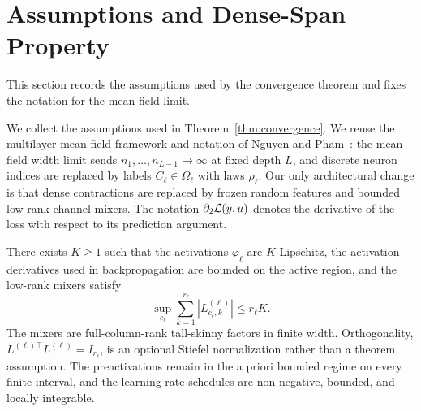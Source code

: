 \section{Assumptions and Dense-Span Property}
\label{app:assumptions}

This section records the assumptions used by the convergence theorem and fixes the notation for the mean-field limit.

We collect the assumptions used in Theorem~\ref{thm:convergence}. We reuse the multilayer mean-field framework and notation of Nguyen and Pham~\cite{nguyen2023}: the mean-field width limit sends $n_1,\ldots,n_{L-1}\to\infty$ at fixed depth $L$, and discrete neuron indices are replaced by labels $C_\ell\in\Omega_\ell$ with laws $\rho_\ell$. Our only architectural change is that dense contractions are replaced by frozen random features and bounded low-rank channel mixers. The notation $\partial_2\mathcal{L}(y,u)$ denotes the derivative of the loss with respect to its prediction argument.

\begin{assumption}
\label{assump:regularity}
There exists $K\ge1$ such that the activations $\varphi_\ell$ are $K$-Lipschitz, the activation derivatives used in backpropagation are bounded on the active region, and the low-rank mixers satisfy
\begin{equation}
\sup_{c_\ell}\sum_{k=1}^{r_\ell}|L^{(\ell)}_{c_\ell,k}|\le r_\ell K .
\end{equation}
The mixers are full-column-rank tall-skinny factors in finite width. Orthogonality, $L^{(\ell)\top}L^{(\ell)}=I_{r_\ell}$, is an optional Stiefel normalization rather than a theorem assumption. The preactivations remain in the a priori bounded regime on every finite interval, and the learning-rate schedules are non-negative, bounded, and locally integrable.
\end{assumption}

